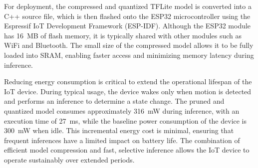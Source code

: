 \documentclass[11pt]{report}
\begin{document}
\begin{table}[h]
  \centering
  \caption{Effect of deep compression on model size, precision, and recall for embedded deployment.}
  \label{tab:deep_compression_results}
\end{table}

For deployment, the compressed and quantized TFLite model is converted into a C++ source file, which is then flashed onto the ESP32 microcontroller using the Espressif IoT Development Framework (ESP-IDF). Although the ESP32 module has 16~MB of flash memory, it is typically shared with other modules such as WiFi and Bluetooth. The small size of the compressed model allows it to be fully loaded into SRAM, enabling faster access and minimizing memory latency during inference.

Reducing energy consumption is critical to extend the operational lifespan of the IoT device. During typical usage, the device wakes only when motion is detected and performs an inference to determine a state change. The pruned and quantized model consumes approximately 316~mW during inference, with an execution time of 27~ms, while the baseline power consumption of the device is 300~mW when idle. This incremental energy cost is minimal, ensuring that frequent inferences have a limited impact on battery life. The combination of efficient model compression and fast, selective inference allows the IoT device to operate sustainably over extended periods.
\end{document}
